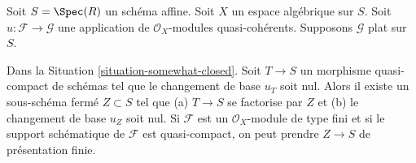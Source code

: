 \begin{situation}
\label{situation-somewhat-closed}
Soit $S = \Spec(R)$ un schéma affine. Soit $X$ un espace algébrique sur
$S$. Soit $u : \mathcal{F} \to \mathcal{G}$ une application de
$\mathcal{O}_X$-modules quasi-cohérents. Supposons $\mathcal{G}$ plat sur $S$.
\end{situation}

\begin{lemma}
\label{lemma-F-zero-somewhat-closed}
Dans la Situation \ref{situation-somewhat-closed}. Soit $T \to S$
un morphisme quasi-compact de schémas tel que le changement de base $u_T$ soit
nul. Alors il existe un sous-schéma fermé $Z \subset S$ tel que
(a) $T \to S$ se factorise par $Z$ et (b) le changement de base $u_Z$ soit nul.
Si $\mathcal{F}$ est un $\mathcal{O}_X$-module de type fini et si
le support schématique de $\mathcal{F}$ est quasi-compact,
on peut prendre $Z \to S$ de présentation finie.
\end{lemma}

